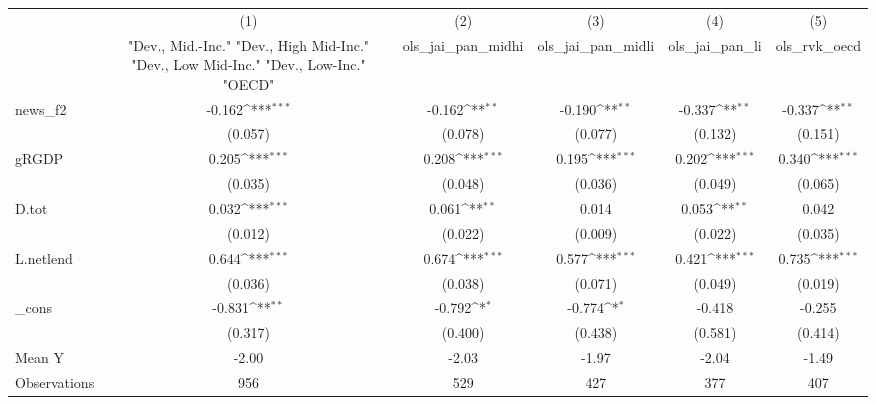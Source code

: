 {
\def\sym#1{\ifmmode^{#1}\else\(^{#1}\)\fi}
\begin{tabular}{l*{5}{c}}
\toprule
            &\multicolumn{1}{c}{(1)}&\multicolumn{1}{c}{(2)}&\multicolumn{1}{c}{(3)}&\multicolumn{1}{c}{(4)}&\multicolumn{1}{c}{(5)}\\
            &\multicolumn{1}{c}{ "Dev., Mid.-Inc." "Dev., High Mid-Inc." "Dev., Low Mid-Inc." "Dev., Low-Inc." "OECD" }&\multicolumn{1}{c}{ols\_jai\_pan\_midhi}&\multicolumn{1}{c}{ols\_jai\_pan\_midli}&\multicolumn{1}{c}{ols\_jai\_pan\_li}&\multicolumn{1}{c}{ols\_rvk\_oecd}\\
\midrule
news\_f2     &      -0.162\sym{***}&      -0.162\sym{**} &      -0.190\sym{**} &      -0.337\sym{**} &      -0.337\sym{**} \\
            &     (0.057)         &     (0.078)         &     (0.077)         &     (0.132)         &     (0.151)         \\
\addlinespace
gRGDP       &       0.205\sym{***}&       0.208\sym{***}&       0.195\sym{***}&       0.202\sym{***}&       0.340\sym{***}\\
            &     (0.035)         &     (0.048)         &     (0.036)         &     (0.049)         &     (0.065)         \\
\addlinespace
D.tot       &       0.032\sym{***}&       0.061\sym{**} &       0.014         &       0.053\sym{**} &       0.042         \\
            &     (0.012)         &     (0.022)         &     (0.009)         &     (0.022)         &     (0.035)         \\
\addlinespace
L.netlend   &       0.644\sym{***}&       0.674\sym{***}&       0.577\sym{***}&       0.421\sym{***}&       0.735\sym{***}\\
            &     (0.036)         &     (0.038)         &     (0.071)         &     (0.049)         &     (0.019)         \\
\addlinespace
\_cons      &      -0.831\sym{**} &      -0.792\sym{*}  &      -0.774\sym{*}  &      -0.418         &      -0.255         \\
            &     (0.317)         &     (0.400)         &     (0.438)         &     (0.581)         &     (0.414)         \\
\midrule
Mean Y      &       -2.00         &       -2.03         &       -1.97         &       -2.04         &       -1.49         \\
Observations&         956         &         529         &         427         &         377         &         407         \\
\bottomrule
\end{tabular}
}
